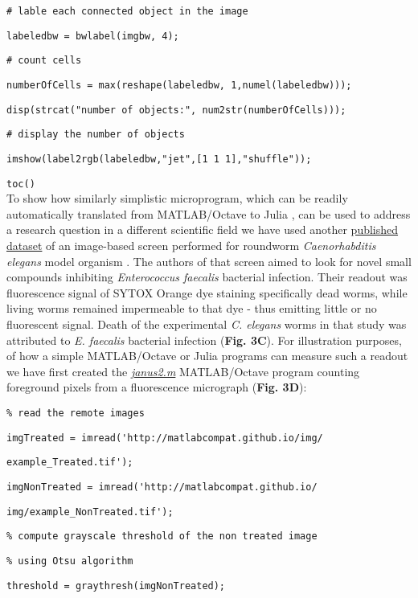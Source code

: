 \verb|# lable each connected object in the image|

\verb|labeledbw = bwlabel(imgbw, 4);|

\verb|# count cells|

\verb|numberOfCells = max(reshape(labeledbw, 1,numel(labeledbw)));|

\verb|disp(strcat("number of objects:", num2str(numberOfCells)));|

\verb|# display the number of objects|

\verb|imshow(label2rgb(labeledbw,"jet",[1 1 1],"shuffle"));|

\verb|toc()|\\


To show how similarly simplistic microprogram, which can be readily automatically translated from MATLAB/Octave to Julia , can be used to address a research question in a different scientific field we have used another \href{http://www.broadinstitute.org/bbbc/BBBC010/}{published dataset} of an image-based screen performed for roundworm \textit{Caenorhabditis elegans} model organism \cite{Moy_2009}. The authors of that screen aimed to look for novel small compounds inhibiting \textit{Enterococcus faecalis} bacterial infection. Their readout was fluorescence signal of SYTOX Orange dye staining specifically dead worms, while living worms remained impermeable to that dye - thus emitting little or no fluorescent signal. Death of the experimental \textit{C. elegans} worms in that study was attributed to \textit{E. faecalis} bacterial infection (\textbf{Fig. 3C}). For illustration purposes, of how a simple MATLAB/Octave or Julia programs can measure such a readout we have first created the \textit{\href{https://github.com/MatlabCompat/MatlabCompat.jl/blob/master/test/janus2.m}{janus2.m}} MATLAB/Octave program counting foreground pixels from a fluorescence micrograph (\textbf{Fig. 3D}): 

\verb|% read the remote images|

\verb|imgTreated = imread('http://matlabcompat.github.io/img/|

\verb|example_Treated.tif');|

\verb|imgNonTreated = imread('http://matlabcompat.github.io/|

\verb|img/example_NonTreated.tif');|

\verb|% compute grayscale threshold of the non treated image|

\verb|% using Otsu algorithm|

\verb|threshold = graythresh(imgNonTreated);|

